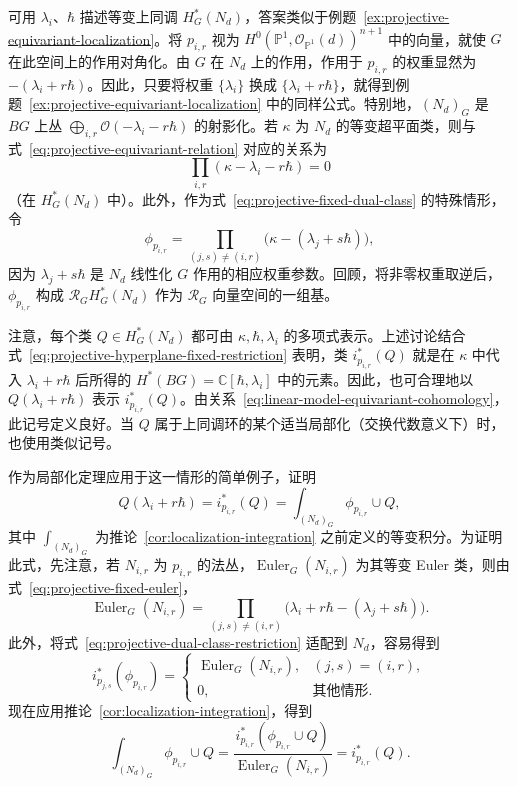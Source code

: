 可用 $\lambda_i$、$\hbar$ 描述等变上同调 $H_G^*(N_d)$，答案类似于例题~\ref{ex:projective-equivariant-localization}。将 $p_{i,r}$ 视为 $H^0(\mathbb P^1,\mathcal O_{\mathbb P^1}(d))^{n+1}$ 中的向量，就使 $G$ 在此空间上的作用对角化。由 $G$ 在 $N_d$ 上的作用，作用于 $p_{i,r}$ 的权重显然为 $-(\lambda_i+r\hbar)$。因此，只要将权重 $\{\lambda_i\}$ 换成 $\{\lambda_i+r\hbar\}$，就得到例题~\ref{ex:projective-equivariant-localization} 中的同样公式。特别地，$(N_d)_G$ 是 $BG$ 上丛 $\bigoplus_{i,r}\mathcal O(-\lambda_i-r\hbar)$ 的射影化。若 $\kappa$ 为 $N_d$ 的等变超平面类，则与式~\eqref{eq:projective-equivariant-relation} 对应的关系为
\begin{equation}\label{eq:linear-model-equivariant-cohomology}
\prod_{i,r}(\kappa-\lambda_i-r\hbar)=0
\end{equation}
（在 $H_G^*(N_d)$ 中）。此外，作为式~\eqref{eq:projective-fixed-dual-class} 的特殊情形，令
\begin{equation}\label{eq:linear-model-fixed-point-class}
\phi_{p_{i,r}}=\prod_{(j,s)\ne(i,r)}\bigl(\kappa-(\lambda_j+s\hbar)\bigr),
\end{equation}
因为 $\lambda_j+s\hbar$ 是 $N_d$ 线性化 $G$ 作用的相应权重参数。回顾，将非零权重取逆后，$\phi_{p_{i,r}}$ 构成 $\mathcal R_GH_G^*(N_d)$ 作为 $\mathcal R_G$ 向量空间的一组基。

注意，每个类 $Q\in H_G^*(N_d)$ 都可由 $\kappa,\hbar,\lambda_i$ 的多项式表示。上述讨论结合式~\eqref{eq:projective-hyperplane-fixed-restriction} 表明，类 $i_{p_{i,r}}^*(Q)$ 就是在 $\kappa$ 中代入 $\lambda_i+r\hbar$ 后所得的 $H^*(BG)=\mathbb C[\hbar,\lambda_i]$ 中的元素。因此，也可合理地以 $Q(\lambda_i+r\hbar)$ 表示 $i_{p_{i,r}}^*(Q)$。由关系~\eqref{eq:linear-model-equivariant-cohomology}，此记号定义良好。当 $Q$ 属于上同调环的某个适当局部化（交换代数意义下）时，也使用类似记号。

作为局部化定理应用于这一情形的简单例子，证明
\begin{equation}\label{eq:linear-model-restriction-integral}
Q(\lambda_i+r\hbar)=i_{p_{i,r}}^*(Q)
=\int_{(N_d)_G}\phi_{p_{i,r}}\cup Q,
\end{equation}
其中 $\int_{(N_d)_G}$ 为推论~\ref{cor:localization-integration} 之前定义的等变积分。为证明此式，先注意，若 $N_{i,r}$ 为 $p_{i,r}$ 的法丛，$\operatorname{Euler}_G(N_{i,r})$ 为其等变 Euler 类，则由式~\eqref{eq:projective-fixed-euler}，
\begin{equation}\label{eq:linear-model-normal-euler}
\operatorname{Euler}_G(N_{i,r})
=\prod_{(j,s)\ne(i,r)}\bigl(\lambda_i+r\hbar-(\lambda_j+s\hbar)\bigr).
\end{equation}
此外，将式~\eqref{eq:projective-dual-class-restriction} 适配到 $N_d$，容易得到
\begin{equation}\label{eq:linear-model-fixed-class-restriction}
i_{p_{j,s}}^*(\phi_{p_{i,r}})=
\begin{cases}\operatorname{Euler}_G(N_{i,r}),&(j,s)=(i,r),\\0,&\text{其他情形}.
\end{cases}
\end{equation}
现在应用推论~\ref{cor:localization-integration}，得到
\[
\int_{(N_d)_G}\phi_{p_{i,r}}\cup Q
=\frac{i_{p_{i,r}}^*(\phi_{p_{i,r}}\cup Q)}{\operatorname{Euler}_G(N_{i,r})}
=i_{p_{i,r}}^*(Q).
\]

